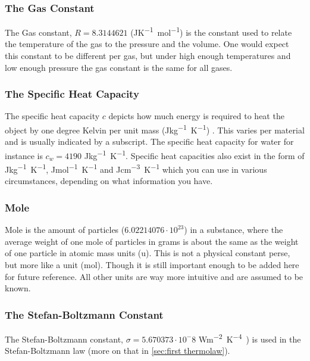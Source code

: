\subsubsection{The Gas Constant} \label{sec:gas constant}
The Gas constant, $R = 8.3144621$ (\si{JK^{-1}mol^{-1}}) \cite{idealGas} is the constant used to relate the temperature of the gas to the pressure and the volume. One would expect this constant to be 
different per gas, but under high enough temperatures and low enough pressure the gas constant is the same for all gases. 

\subsubsection{The Specific Heat Capacity}
The specific heat capacity $c$ depicts how much energy is required to heat the object by one degree Kelvin per unit mass (\si{Jkg^{-1}K^{-1}}) \cite{specificHeat}. This varies per material 
and is usually indicated by a subscript. The specific heat capacity for water for instance is $c_w = 4190$ \si{Jkg^{-1}K^{-1}}. Specific heat capacities also exist in the form of 
\si{Jkg^{-1}K^{-1}}, \si{Jmol^{-1}K^{-1}} and \si{Jcm^{-3}K^{-1}} which you can use in various circumstances, depending on what information you have.

\subsubsection{Mole}
Mole is the amount of particles ($6.02214076 \cdot 10^{23}$) in a substance, where the average weight of one mole of particles in grams is about the same as the weight of one particle in atomic 
mass units (\si{u})\cite{mole}. This is not a physical constant perse, but more like a unit (\si{mol}). Though it is still important enough to be added here for future reference. All other units are 
way more intuitive and are assumed to be known.

\subsubsection{The Stefan-Boltzmann Constant}
The Stefan-Boltzmann constant, $\sigma = 5.670373 \cdot 10^-8$ \si{Wm^{-2}K^{-4})} \cite{stefan-boltzmann} is used in the Stefan-Boltzmann law (more on that in \autoref{sec:first thermolaw}). 

